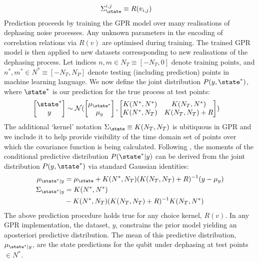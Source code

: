 \begin{align}
\Sigma_\state^{i,j} & \equiv R(v_{i,j}) 
\end{align}
Prediction proceeds by training the GPR model over many realisations of dephasing noise processes. Any unknown parameters in the encoding of correlation relations via $R(v)$ are optimised during training. The trained GPR model is then applied to new datasets corressponding to new realisations of the dephasing process. Let indices $n,m \in N_T \equiv [-N_T, 0]$ denote training points, and $n^*,m^* \in N^* \equiv [-N_T, N_P]$ denote testing (including prediction) points in machine learning language. We now define the joint distribution $P(y,\state^*)$, where $\state^*$ is our prediction for the true process at test points: 
\begin{align}
\begin{bmatrix} \state^* \\y \end{bmatrix} & \sim \mathcal{N} (\begin{bmatrix} \mu_{\state^*} \\ \mu_y
\end{bmatrix} , \begin{bmatrix}   K(N^*,N^*)&K(N_T,N^*) \\ K(N^*,N_T) & K(N_T,N_T) + R \end{bmatrix} )
\end{align}
The additional `kernel' notation $\Sigma_\state  \equiv K(N_T, N_T)$ is ubitiquous in GPR and we include it to help provide visibility of the time domain set of points over which the covariance function is being calculated. Following \cite{rasmussen2006}, the moments of the conditional predictive distribution $P(\state^*|y)$ can be derived from the joint distribution $P(y,\state^*)$ via standard Gaussian identities:
\begin{align}
\mu_{\state^*|y} &= \mu_\state + K(N^*,N_T)(K(N_T,N_T) + R )^{-1} (y - \mu_y) \\
\Sigma_{\state^*|y} &= K(N^*,N^*) \nonumber \\
& - K(N^*,N_T)(K(N_T, N_T) + R)^{-1}K(N_T,N^*) 
\end{align}
The above prediction procedure holds true for any choice kernel, $R(v)$. In any GPR implementation, the dataset, $y$, constrains the prior model yielding an aposteriori predictive distribution. The mean of this predictive distribution, $\mu_{\state^*|y}$, are the state predictions for the qubit under dephasing at test points $\in N^*$.
\\
